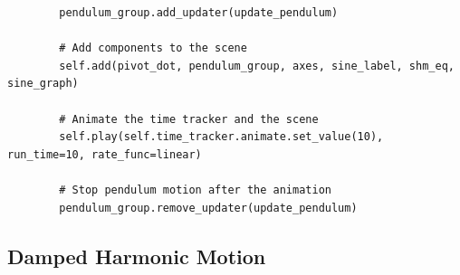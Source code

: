 \documentclass[12pt,a4paper]{article}
\begin{document}
\begin{verbatim}
        pendulum_group.add_updater(update_pendulum)

        # Add components to the scene
        self.add(pivot_dot, pendulum_group, axes, sine_label, shm_eq, sine_graph)

        # Animate the time tracker and the scene
        self.play(self.time_tracker.animate.set_value(10), run_time=10, rate_func=linear)

        # Stop pendulum motion after the animation
        pendulum_group.remove_updater(update_pendulum)

\end{verbatim}


\subsection{Damped Harmonic Motion}
\end{document}
